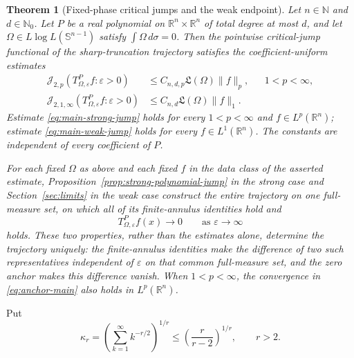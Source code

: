 \documentclass[11pt]{article}
\numberwithin{equation}{section}
\newtheorem{theorem}{Theorem}[section]
\theoremstyle{remark}
\theoremstyle{definition}
\newcommand{\R}{\mathbb R}
\newcommand{\Sph}{\mathbb S}
\newcommand{\norm}[1]{\lVert #1\rVert}
\newcommand{\Jop}[1]{\mathcal J_{2,#1}}
\begin{document}
\begin{theorem}[Fixed-phase critical jumps and the weak endpoint]
\label{thm:main}
Let $n\in\mathbb N$ and $d\in\mathbb N_0$.  Let $P$ be a real polynomial on
$\R^n\times\R^n$ of total degree at most $d$, and let
$\Omega\in L\log L(\Sph^{n-1})$ satisfy $\int\Omega\,d\sigma=0$.
Then the pointwise critical-jump functional of the sharp-truncation
trajectory satisfies the coefficient-uniform estimates
\begin{align}
 \Jop{p}(T^P_{\Omega,\varepsilon}f:\varepsilon>0)
 &\le C_{n,d,p}\mathfrak L(\Omega)\norm f_p,
 &&1<p<\infty,\label{eq:main-strong-jump}\\
 \Jop{1,\infty}(T^P_{\Omega,\varepsilon}f:\varepsilon>0)
 &\le C_{n,d}\mathfrak L(\Omega)\norm f_1.
 \label{eq:main-weak-jump}
\end{align}
Estimate \eqref{eq:main-strong-jump} holds for every $1<p<\infty$ and
$f\in L^p(\R^n)$; estimate \eqref{eq:main-weak-jump} holds for every
$f\in L^1(\R^n)$.  The constants are independent of every coefficient of
$P$.

For each fixed $\Omega$ as above and each fixed $f$ in the data class of
the asserted estimate, Proposition~\ref{prop:strong-polynomial-jump} in the
strong case and Section~\ref{sec:limits} in the weak case construct the
entire trajectory on one full-measure set, on which all of its finite-annulus
identities hold and
\begin{equation}\label{eq:anchor-main}
 T^P_{\Omega,\varepsilon}f(x)\longrightarrow0
 \qquad\text{as }\varepsilon\to\infty
\end{equation}
holds.  These two properties, rather than the estimates alone, determine
the trajectory uniquely: the finite-annulus identities make the difference
of two such representatives independent of $\varepsilon$ on that common
full-measure set, and the zero anchor makes this difference vanish.  When
$1<p<\infty$, the convergence in \eqref{eq:anchor-main} also holds in
$L^p(\mathbb R^n)$.
\end{theorem}

Put
\begin{equation}\label{eq:kappa-r}
 \kappa_r=\left(\sum_{k=1}^\infty k^{-r/2}\right)^{1/r}
 \le \left(\frac r{r-2}\right)^{1/r},\qquad r>2.
\end{equation}
\end{document}
